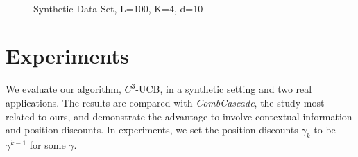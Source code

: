\documentclass{article}
\begin{document}
\begin{figure}
	\centering
	\\
	\caption{Synthetic Data Set, L=100, K=4, d=10}
	\label{fig:synthetic} %
\end{figure}



\section{Experiments}

We evaluate our algorithm, $C^3$-UCB, in a synthetic setting and two real applications. The results are compared with {\it CombCascade}, the study most related to ours, and demonstrate the advantage to involve contextual information and position discounts. In experiments, we set the position discounts $\gamma_k$ to be $\gamma^{k-1}$ for some $\gamma$. 
\end{document}
